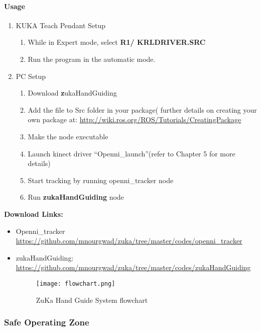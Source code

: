 \paragraph{Usage}
\begin{enumerate}
	\item KUKA Teach Pendant Setup
	\begin{enumerate}
		\item While in Expert mode, select \textbf{R1/ KRLDRIVER.SRC}
		\item Run the program in the automatic mode.
	\end{enumerate}
\item PC Setup
\begin{enumerate}
		\item Download \textbf zukaHandGuiding
		\item Add the file to Src folder in your package( further details on creating your own package at:
		\newline	\url{http://wiki.ros.org/ROS/Tutorials/CreatingPackage}
		
		\item Make the node executable
		\item Launch kinect driver “Openni\_launch”(refer to Chapter 5 for more details)
		\item Start tracking by running openni\_tracker node
		\item Run \textbf{zukaHandGuiding} node
		
	\end{enumerate}
	
\end{enumerate}

\textbf{Download Links:}
\begin{itemize}
	\item Openni\_tracker \newline \url{
		https://github.com/mnourgwad/zuka/tree/master/codes/openni_tracker }
	
	\item	zukaHandGuiding: \newline \url{
		https://github.com/mnourgwad/zuka/tree/master/codes/zukaHandGuiding }
	\begin{figure}[H]
		\centering
		\caption{ZuKa Hand Guide System flowchart}
		\texttt{[image: flowchart.png]}
	\end{figure} 
\end{itemize}

\newpage
\subsubsection{Safe Operating Zone}

